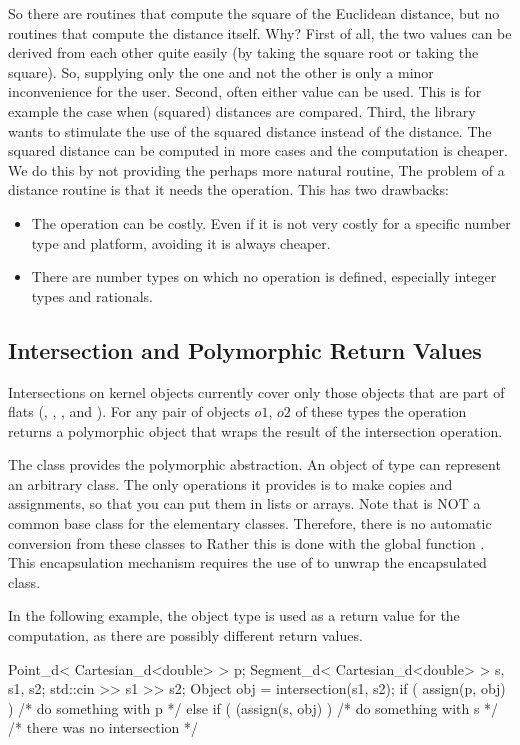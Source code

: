 So there are routines that compute the square of the Euclidean
distance, but no routines that compute the distance itself. Why?
First of all, the two values can be derived from each other quite
easily (by taking the square root or taking the square). So, supplying
only the one and not the other is only a minor inconvenience for the
user.  Second, often either value can be used. This is for example the
case when (squared) distances are compared.  Third, the library wants
to stimulate the use of the squared distance instead of the distance.
The squared distance can be computed in more cases and the computation
is cheaper.  We do this by not providing the perhaps more natural
routine, The problem of a distance routine is that it needs the
 operation.  This has two drawbacks:
\begin{itemize}
\item The  operation can be costly. Even if it is not
  very costly for a specific number type and platform, avoiding it is
  always cheaper.
\item There are number types on which no  operation is
  defined, especially integer types and rationals.
\end{itemize}

\subsection{Intersection and Polymorphic Return Values}

Intersections on kernel objects currently cover only those objects
that are part of flats (, ,
, and ).  For any pair of objects
$o1$, $o2$ of these types the operation 
returns a polymorphic object that wraps the result of the intersection
operation.

The class  provides the polymorphic abstraction.  An
object  of type  can represent an arbitrary
class. The only operations it provides is to make copies and
assignments, so that you can put them in lists or arrays. Note that
 is NOT a common base class for the elementary classes.
Therefore, there is no automatic conversion from these classes to
 Rather this is done with the global function
. This encapsulation mechanism requires the use of
 to unwrap the encapsulated class.

\ccExample 
In the following example, the object type is used as a return value for
the  computation, as there are
possibly different return values.
\ccHtmlLinksOff%
\begin{cprog}
  Point_d< Cartesian_d<double> > p;
  Segment_d< Cartesian_d<double> > s, s1, s2;
  std::cin >> s1 >> s2;
  Object obj = intersection(s1, s2);
  if ( assign(p, obj) ) {
    /* do something with p */
  } else if ( (assign(s, obj) ) {
    /* do something with s */
  }
  /*  there was no intersection */
\end{cprog}
\ccHtmlLinksOn%

